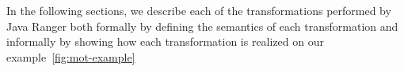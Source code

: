 In the following sections, we describe each of the transformations performed by Java Ranger both formally by defining the semantics of each transformation and informally by showing how each transformation is realized on our example~\ref{fig:mot-example}



